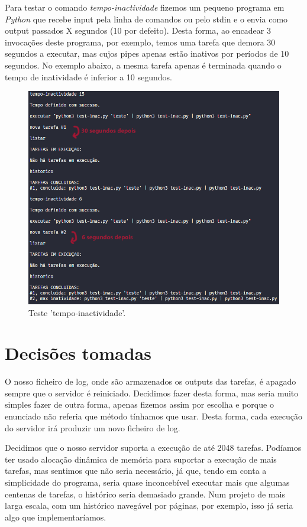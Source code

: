 \documentclass[a4paper]{report}
\begin{document}
	\pagebreak
	Para testar o comando \emph{tempo-inactividade} fizemos um pequeno programa em \emph{Python} que recebe input pela linha de comandos ou pelo stdin e o envia como output passados X segundos (10 por defeito). Desta forma, ao encadear 3 invocações deste programa, por exemplo, temos uma tarefa que demora 30 segundos a executar, mas cujos pipes apenas estão inativos por períodos de 10 segundos. No exemplo abaixo, a mesma tarefa apenas é terminada quando o tempo de inatividade é inferior a 10 segundos.
	\begin{figure}[H]
		\centering
		\includegraphics[width=.9\linewidth]{teste4.png}
		\caption{Teste 'tempo-inactividade'.}
		\label{fig:test4}
	\end{figure}
		
	\chapter{Decisões tomadas}
	
	O nosso ficheiro de log, onde são armazenados os outputs das tarefas, é apagado sempre que o servidor é reiniciado. Decidimos fazer desta forma, mas seria muito simples fazer de outra forma, apenas fizemos assim por escolha e porque o enunciado não referia que método tínhamos que usar. Desta forma, cada execução do servidor irá produzir um novo ficheiro de log.
	
	Decidimos que o nosso servidor suporta a execução de até 2048 tarefas. Podíamos ter usado alocação dinâmica de memória para suportar a execução de mais tarefas, mas sentimos que não seria necessário, já que, tendo em conta a simplicidade do programa, seria quase inconcebível executar mais que algumas centenas de tarefas, o histórico seria demasiado grande. Num projeto de mais larga escala, com um histórico navegável por páginas, por exemplo, isso já seria algo que implementaríamos.
	
\end{document}
